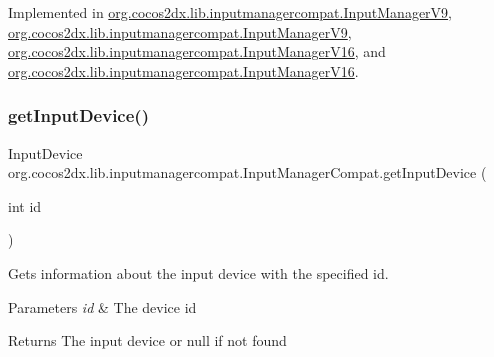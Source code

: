 Implemented in \hyperlink{classorg_1_1cocos2dx_1_1lib_1_1inputmanagercompat_1_1InputManagerV9_a86e8c5b196c4f0707dccc1d0f6b1d0dd}{org.\+cocos2dx.\+lib.\+inputmanagercompat.\+Input\+Manager\+V9}, \hyperlink{classorg_1_1cocos2dx_1_1lib_1_1inputmanagercompat_1_1InputManagerV9_a86e8c5b196c4f0707dccc1d0f6b1d0dd}{org.\+cocos2dx.\+lib.\+inputmanagercompat.\+Input\+Manager\+V9}, \hyperlink{classorg_1_1cocos2dx_1_1lib_1_1inputmanagercompat_1_1InputManagerV16_ab7a4f0ce39114a0c891c2c6642f61e4c}{org.\+cocos2dx.\+lib.\+inputmanagercompat.\+Input\+Manager\+V16}, and \hyperlink{classorg_1_1cocos2dx_1_1lib_1_1inputmanagercompat_1_1InputManagerV16_ab7a4f0ce39114a0c891c2c6642f61e4c}{org.\+cocos2dx.\+lib.\+inputmanagercompat.\+Input\+Manager\+V16}.

\mbox{\label{interfaceorg_1_1cocos2dx_1_1lib_1_1inputmanagercompat_1_1InputManagerCompat_afbfb5229b12433c81ddbf9e0315cd986}} 
\subsubsection{\texorpdfstring{get\+Input\+Device()}{getInputDevice()}\hspace{0.1cm}{\footnotesize\ttfamily [2/2]}}
{\footnotesize\ttfamily Input\+Device org.\+cocos2dx.\+lib.\+inputmanagercompat.\+Input\+Manager\+Compat.\+get\+Input\+Device (\begin{DoxyParamCaption}\item[{int}]{id }\end{DoxyParamCaption})}

Gets information about the input device with the specified id.


\begin{DoxyParams}{Parameters}
{\em id} & The device id \\
\hline
\end{DoxyParams}
\begin{DoxyReturn}{Returns}
The input device or null if not found 
\end{DoxyReturn}


